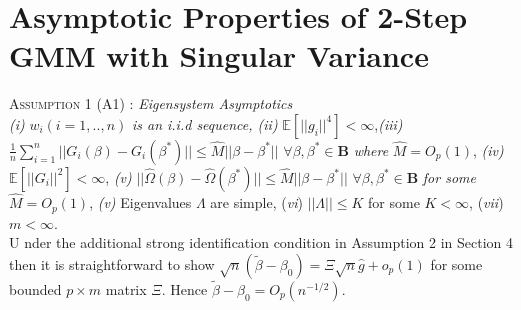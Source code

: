 \documentclass[11pt, fleqn]{article}
\begin{document}
\section{ Asymptotic Properties of 2-Step GMM with Singular Variance}


\textsc{Assumption 1 (A1)} : \textit{Eigensystem  Asymptotics}\\
\textit{(i) }$w_i (i=1,..,n)$ \textit{is an i.i.d sequence, (ii) } $\mathbb{E}[|\!| g_i|\!|^4] <\infty$,\textit{(iii)} $ \frac{1}{n} \sum_{i=1}^n|\!| G_i(\beta)-G_i(\beta^*)|\!| \leq \hat{M} |\!|\beta-\beta^*|\!| $  $\forall \beta,\beta^* \in \mathbf{B}$ \textit{where} $\hat{M}=O_p(1)$, \textit{(iv)} $\mathbb{E}[|\!| G_i|\!|^2] <\infty$, \textit{(v)} $|\!| \hat{\Omega}(\beta)-\hat{\Omega}(\beta^*)|\!|\leq \hat{M} |\!| \beta-\beta^*|\!| $ $\forall \beta,\beta^* \in \mathbf{B}$ \textit{for some} $\hat{M}=O_p(1)$, \textit{(v)} Eigenvalues $\Lambda$ are simple, (\textit{vi}) $|\!|\Lambda|\!|\leq K$ for some $K<\infty$, (\textit{vii})$m<\infty$.\\
 U
 nder the additional strong identification condition in Assumption 2 in Section 4 then it is straightforward to show $\sqrt{n}(\tilde{\beta}-\beta_0)=\Xi\sqrt{n}\hat{g}+o_p(1)$ for some bounded $p \times m$ matrix $\Xi$. Hence $\tilde{\beta}-\beta_0=O_p(n^{-1/2})$.
\end{document}
